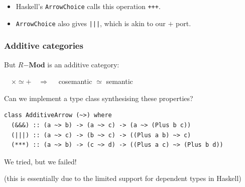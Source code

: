 \documentclass[10pt]{beamer}
\begin{document}
\begin{frame}
\begin{center}
  \end{center}

  \begin{itemize}
  \item Haskell's \lstinline{ArrowChoice} calls this operation
    \alert{\lstinline{+++}}.
  \item \lstinline{ArrowChoice} also gives \alert{\lstinline{|||}},
    which is akin to our \alert{$+$} port.
  \end{itemize}
\end{frame}


\lstset{basicstyle=\ttfamily\small}
\lstset{language=Haskell}

\begin{frame}[fragile]
  \frametitle{Additive categories}

  \begin{center}
    \large
    But $R\mathbf{-Mod}$ is an \alert{additive} category:

    $\quad\times\simeq+\quad\Rightarrow\quad$ cosemantic $\simeq$
    semantic
  \end{center}

  \begin{block}{Can we implement a type class synthesising these properties?}
\begin{lstlisting}
class AdditiveArrow (~>) where
  (&&&) :: (a ~> b) -> (a ~> c) -> (a ~> (Plus b c))
  (|||) :: (a ~> c) -> (b ~> c) -> ((Plus a b) ~> c)
  (***) :: (a ~> b) -> (c ~> d) -> ((Plus a c) ~> (Plus b d))
\end{lstlisting}
  \end{block}

  \pause
  
  \begin{center}
    \Large
    We tried, but we failed!

    \normalsize (this is essentially due to the limited support for
    dependent types in Haskell)
  \end{center}
  
\end{frame}
\end{document}
